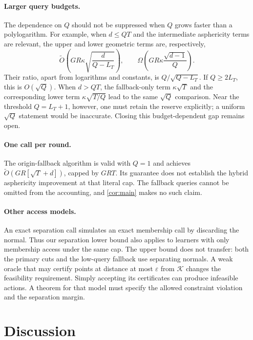 \documentclass[11pt]{article}
\newcommand{\K}{\mathcal K}
\newcommand{\wtO}{\widetilde O}
\newcommand{\eps}{\varepsilon}
\theoremstyle{definition}
\newcounter{algorithm}
\begin{document}
\paragraph{Larger query budgets.}
The dependence on $Q$ should not be suppressed when $Q$ grows faster than
a polylogarithm. For example, when $d\le QT$ and the intermediate
asphericity terms are relevant, the upper and lower geometric terms are,
respectively,
\begin{equation}\label{eq:Qgap}
 \wtO\!\left(GR\kappa\sqrt{\frac d{Q-L_T}}\right),
 \qquad
 \Omega\!\left(GR\kappa\frac{\sqrt{d-1}}{Q}\right).
\end{equation}
Their ratio, apart from logarithms and constants, is
$Q/\sqrt{Q-L_T}$. If $Q\ge2L_T$, this is $O(\sqrt Q)$.
When $d>QT$, the fallback-only term $\kappa\sqrt T$ and the corresponding
lower term $\kappa\sqrt{T/Q}$ lead to the same $\sqrt Q$ comparison.
Near the threshold $Q=L_T+1$, however, one must retain the reserve
explicitly; a uniform $\sqrt Q$ statement would be inaccurate.
Closing this budget-dependent gap remains open.

\paragraph{One call per round.}
The origin-fallback algorithm is valid with $Q=1$ and achieves
$\wtO(GR[\sqrt T+d])$, capped by $GRT$.
Its guarantee does not establish the hybrid asphericity improvement at
that literal cap. The fallback queries cannot be omitted from the
accounting, and \cref{cor:main} makes no such claim.

\paragraph{Other access models.}
An exact separation call simulates an exact membership call by discarding
the normal. Thus our separation lower bound also applies to learners with
only membership access under the same cap. The upper bound does not
transfer: both the primary cuts and the low-query fallback use separating
normals. A weak oracle that may certify points at distance at most
$\eps$ from $\K$ changes the feasibility requirement. Simply accepting
its certificates can produce infeasible actions. A theorem for that model
must specify the allowed constraint violation and the separation margin.

\section{Discussion}
\end{document}
